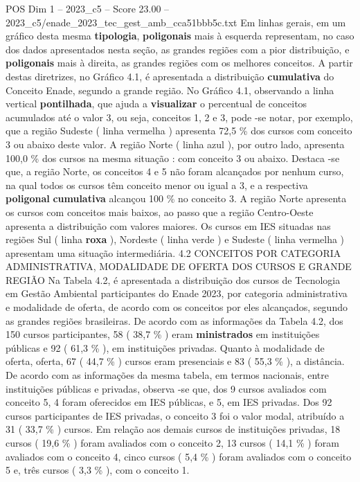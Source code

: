 \begin{textsample}{POS Dim 1 – 2023\_c5 – Score 23.00 – 2023\_c5/enade\_2023\_tec\_gest\_amb\_cca51bbb5c.txt}
Em linhas gerais, em um gráfico desta mesma \textbf{tipologia}, \textbf{poligonais} mais à esquerda representam, no caso dos dados apresentados nesta seção, as grandes regiões com a pior distribuição, e \textbf{poligonais} mais à direita, as grandes regiões com os melhores conceitos.
A partir destas diretrizes, no Gráfico 4.1, é apresentada a distribuição \textbf{cumulativa} do Conceito Enade, segundo a grande região.
No Gráfico 4.1, observando a linha vertical \textbf{pontilhada}, que ajuda a \textbf{visualizar} o percentual de conceitos acumulados até o valor 3, ou seja, conceitos 1, 2 e 3, pode -se notar, por exemplo, que a região Sudeste ( linha vermelha ) apresenta 72,5 \% dos cursos com conceito 3 ou abaixo deste valor.
A região Norte ( linha azul ), por outro lado, apresenta 100,0 \% dos cursos na mesma situação : com conceito 3 ou abaixo.
Destaca -se que, a região Norte, os conceitos 4 e 5 não foram alcançados por nenhum curso, na qual todos os cursos têm conceito menor ou igual a 3, e a respectiva \textbf{poligonal} \textbf{cumulativa} alcançou 100 \% no conceito 3.
A região Norte apresenta os cursos com conceitos mais baixos, ao passo que a região Centro-Oeste apresenta a distribuição com valores maiores.
Os cursos em IES situadas nas regiões Sul ( linha \textbf{roxa} ), Nordeste ( linha verde ) e Sudeste ( linha vermelha ) apresentam uma situação intermediária. 4.2 CONCEITOS POR CATEGORIA ADMINISTRATIVA, MODALIDADE DE OFERTA DOS CURSOS E GRANDE REGIÃO Na Tabela 4.2, é apresentada a distribuição dos cursos de Tecnologia em Gestão Ambiental participantes do Enade 2023, por categoria administrativa e modalidade de oferta, de acordo com os conceitos por eles alcançados, segundo as grandes regiões brasileiras.
De acordo com as informações da Tabela 4.2, dos 150 cursos participantes, 58 ( 38,7 \% ) eram \textbf{ministrados} em instituições públicas e 92 ( 61,3 \% ), em instituições privadas.
Quanto à modalidade de oferta, oferta, 67 ( 44,7 \% ) cursos eram presenciais e 83 ( 55,3 \% ), a distância.
De acordo com as informações da mesma tabela, em termos nacionais, entre instituições públicas e privadas, observa -se que, dos 9 cursos avaliados com conceito 5, 4 foram oferecidos em IES públicas, e 5, em IES privadas.
Dos 92 cursos participantes de IES privadas, o conceito 3 foi o valor modal, atribuído a 31 ( 33,7 \% ) cursos.
Em relação aos demais cursos de instituições privadas, 18 cursos ( 19,6 \% ) foram avaliados com o conceito 2, 13 cursos ( 14,1 \% ) foram avaliados com o conceito 4, cinco cursos ( 5,4 \% ) foram avaliados com o conceito 5 e, três cursos ( 3,3 \% ), com o conceito 1.

\end{textsample}
